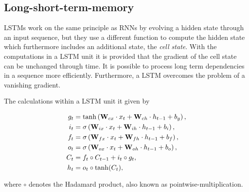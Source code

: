 \subsection{Long-short-term-memory}

LSTMs work on the same principle as RNNs by evolving a hidden state through an input sequence, but they use a different function to compute the hidden state which furthermore includes an additional state, the \textit{cell state}. With the computations in a LSTM unit it is provided that the gradient of the cell state can be unchanged through time. It is possible to process long term dependencies in a sequence more efficiently. Furthermore, a LSTM overcomes the problem of a vanishing gradient.

The calculations within a LSTM unit it given by

\begin{align}
    g_t&=\tanh\left(\textbf{W}_{cx}\cdot x_t + \textbf{W}_{ch}\cdot h_{t-1} + b_g\right), \notag\\
    i_t&=\sigma\left(\textbf{W}_{ix}\cdot x_t + \textbf{W}_{ih}\cdot h_{t-1} + b_i\right), \notag\\
    f_t&=\sigma\left(\textbf{W}_{fx}\cdot x_t + \textbf{W}_{fh}\cdot h_{t-1} + b_f\right), \notag\\
    o_t&=\sigma\left(\textbf{W}_{ox}\cdot x_t + \textbf{W}_{oh}\cdot h_{t-1} + b_o\right), \notag\\
    C_t&=f_t\circ C_{t-1}+i_t\circ g_t, \notag\\
    h_t&=o_t\circ\tanh(C_t),\notag\\
    \label{eq:lstm}
\end{align}

where $\circ$ denotes the Hadamard product, also known as pointwise-multiplication.

